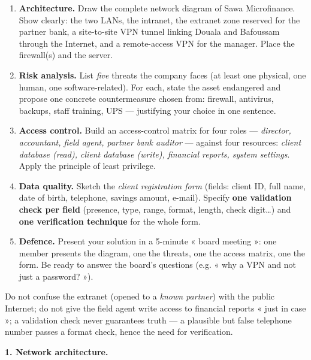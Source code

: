 \documentclass[11pt]{article}
\newcounter{popsec}
\newcounter{popsub}
\newcommand{\courssub}[1]{%
  \stepcounter{popsub}%
  \par\vspace{9pt}\noindent{\popxbold\fontsize{11.5}{13}\selectfont\color{popink}{\color{poporange}\thepopsec.\thepopsub}\hspace{6pt}#1}\par\nopagebreak\vspace{4pt}
}
\begin{document}
\begin{enumerate}
\item \textbf{Architecture.} Draw the complete network diagram of Sawa Microfinance. Show clearly: the two LANs, the intranet, the extranet zone reserved for the partner bank, a site-to-site VPN tunnel linking Douala and Bafoussam through the Internet, and a remote-access VPN for the manager. Place the firewall(s) and the server.
\item \textbf{Risk analysis.} List \emph{five} threats the company faces (at least one physical, one human, one software-related). For each, state the asset endangered and propose one concrete countermeasure chosen from: firewall, antivirus, backups, staff training, UPS — justifying your choice in one sentence.
\item \textbf{Access control.} Build an access-control matrix for four roles — \emph{director, accountant, field agent, partner bank auditor} — against four resources: \emph{client database (read), client database (write), financial reports, system settings}. Apply the principle of least privilege.
\item \textbf{Data quality.} Sketch the \emph{client registration form} (fields: client ID, full name, date of birth, telephone, savings amount, e-mail). Specify \textbf{one validation check per field} (presence, type, range, format, length, check digit\ldots) and \textbf{one verification technique} for the whole form.
\item \textbf{Defence.} Present your solution in a 5-minute « board meeting »: one member presents the diagram, one the threats, one the access matrix, one the form. Be ready to answer the board's questions (e.g. « why a VPN and not just a password? »).
\end{enumerate}

\begin{attention}
Do not confuse the extranet (opened to a \emph{known partner}) with the public Internet; do not give the field agent write access to financial reports « just in case »; a validation check never guarantees truth — a plausible but false telephone number passes a format check, hence the need for verification.
\end{attention}

\courssub{Model answer}

\textbf{1. Network architecture.}
\end{document}
